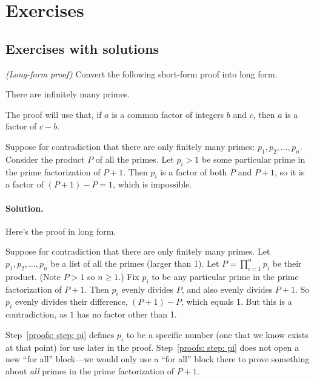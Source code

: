 
\section{Exercises}\label{proofs: sec: exercises}

\subsection{Exercises with solutions}\label{proofs: sec: exercises with solutions}

\exercise \emph{(Long-form proof)} Convert the following short-form proof into long form.

\begin{theorem}\label{proofs: thm: primes}
  There are infinitely many primes.
\end{theorem}

\noindent
The proof will use that, if $a$ is a common factor of integers $b$ and $c$,
then $a$ is a factor of $c-b$.

\begin{shortFormProof}
  Suppose for contradiction that there are only finitely many primes:
  $p_1, p_2, \ldots, p_n$.
  Consider the product $P$ of all the primes.
  Let $p_i>1$ be some particular prime in the prime factorization of $P+1$.
  Then $p_i$ is a factor of both $P$ and $P+1$,
  so it is a factor of $(P+1)-P = 1$,
  which is impossible.
\end{shortFormProof}

\paragraph{Solution.}  Here's the proof in long form.

\begin{longFormProof}
  \step Suppose for contradiction that there are only finitely many primes.
  \step Let $p_1, p_2, \ldots, p_n$ be a list of all the primes (larger than 1).
  \step Let $P=\prod_{i=1}^n p_i$ be their product.  (Note $P>1$ so $n\ge 1$.)
  \step\label{proofs: step: pi} Fix $p_i$ to be any particular prime in the prime factorization of $P+1$.
  \step Then $p_i$ evenly divides $P$, and also evenly divides $P+1$.
  \step So $p_i$ evenly divides their difference, $(P+1) - P$, which equals 1.
  \step But this is a contradiction, as $1$ has no factor other than 1.
\end{longFormProof}
Step~\ref{proofs: step: pi} 
defines $p_i$ to be a specific number (one that we know exists at that point)
for use later in the proof.
Step~\ref{proofs: step: pi}  does not open a new ``for all'' block---we would only use a ``for all'' block there
to prove something about \emph{all} primes in the prime factorization of $P+1$.

